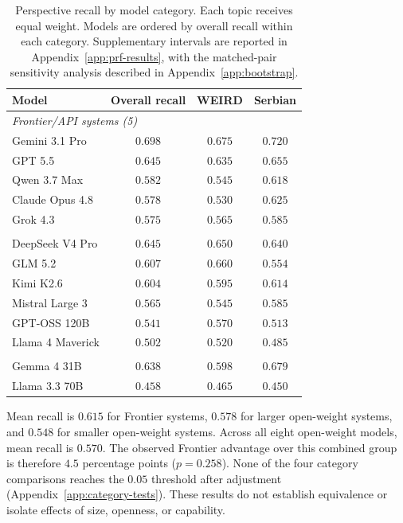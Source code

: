 \documentclass[11pt,a4paper]{article}
\begin{document}
\begin{table}[!t]
\centering
\small
\caption{Perspective recall by model category. Each topic receives equal weight. Models are ordered by overall recall within each category. Supplementary intervals are reported in Appendix~\ref{app:prf-results}, with the matched-pair sensitivity analysis described in Appendix~\ref{app:bootstrap}.}
\label{tab:model-recall}
\begin{tabular}{lccc}
\toprule
Model & Overall recall & WEIRD & Serbian \\
\midrule
\multicolumn{4}{l}{\textit{Frontier/API systems (5)}}\\
Gemini 3.1 Pro & $0.698$ & $0.675$ & $0.720$\\
GPT 5.5 & $0.645$ & $0.635$ & $0.655$\\
Qwen 3.7 Max & $0.582$ & $0.545$ & $0.618$\\
Claude Opus 4.8 & $0.578$ & $0.530$ & $0.625$\\
Grok 4.3 & $0.575$ & $0.565$ & $0.585$\\
\addlinespace
\multicolumn{4}{l}{\textit{Larger open-weight systems (6)}}\\
DeepSeek V4 Pro & $0.645$ & $0.650$ & $0.640$\\
GLM 5.2 & $0.607$ & $0.660$ & $0.554$\\
Kimi K2.6 & $0.604$ & $0.595$ & $0.614$\\
Mistral Large 3 & $0.565$ & $0.545$ & $0.585$\\
GPT-OSS 120B & $0.541$ & $0.570$ & $0.513$\\
Llama 4 Maverick & $0.502$ & $0.520$ & $0.485$\\
\addlinespace
\multicolumn{4}{l}{\textit{Smaller open-weight systems (2)}}\\
Gemma 4 31B & $0.638$ & $0.598$ & $0.679$\\
Llama 3.3 70B & $0.458$ & $0.465$ & $0.450$\\
\bottomrule
\end{tabular}
\end{table}

Mean recall is $0.615$ for Frontier systems, $0.578$ for larger open-weight systems, and $0.548$ for smaller open-weight systems. Across all eight open-weight models, mean recall is $0.570$. The observed Frontier advantage over this combined group is therefore $4.5$ percentage points ($p=0.258$). None of the four category comparisons reaches the $0.05$ threshold after adjustment (Appendix~\ref{app:category-tests}). These results do not establish equivalence or isolate effects of size, openness, or capability.
\end{document}
